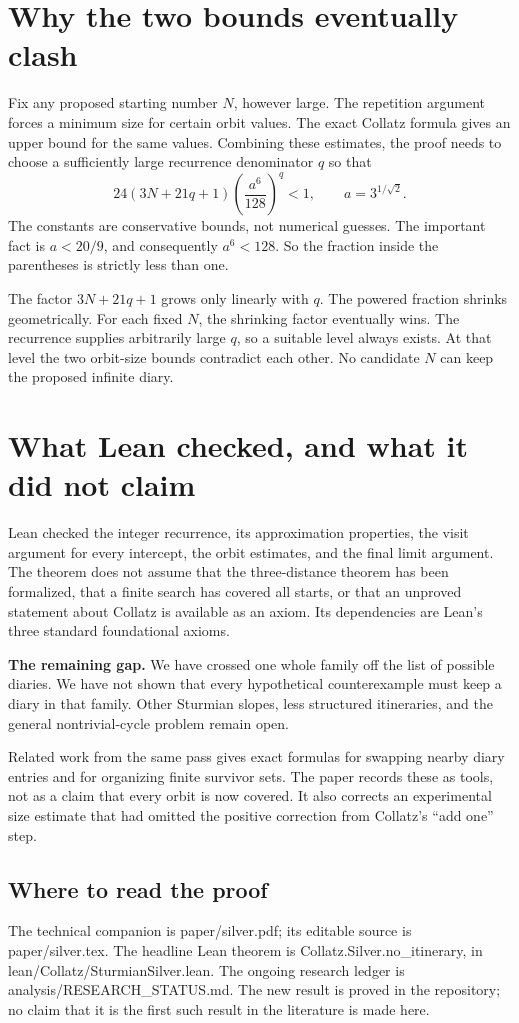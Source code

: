 \documentclass[11pt]{article}
\newcommand{\code}[1]{{\small\ttfamily #1}}
\begin{document}
\newpage
\section{Why the two bounds eventually clash}
Fix any proposed starting number $N$, however large. The repetition
argument forces a minimum size for certain orbit values. The exact
Collatz formula gives an upper bound for the same values. Combining
these estimates, the proof needs to choose a sufficiently large
recurrence denominator $q$ so that
\[
24(3N+21q+1)\left(\frac{a^6}{128}\right)^q<1,
\qquad a=3^{1/\sqrt2}.
\]
The constants are conservative bounds, not numerical guesses. The
important fact is $a<20/9$, and consequently $a^6<128$. So the fraction
inside the parentheses is strictly less than one.

The factor $3N+21q+1$ grows only linearly with $q$. The powered fraction
shrinks geometrically. For each fixed $N$, the shrinking factor eventually
wins. The recurrence supplies arbitrarily large $q$, so a suitable level
always exists. At that level the two orbit-size bounds contradict each
other. No candidate $N$ can keep the proposed infinite diary.

\section{What Lean checked, and what it did not claim}
Lean checked the integer recurrence, its approximation properties, the
visit argument for every intercept, the orbit estimates, and the final
limit argument. The theorem does not assume that the three-distance
theorem has been formalized, that a finite search has covered all starts,
or that an unproved statement about Collatz is available as an axiom.
Its dependencies are Lean's three standard foundational axioms.

\begin{keyidea}
\textbf{The remaining gap.} We have crossed one whole family off the list
of possible diaries. We have not shown that every hypothetical
counterexample must keep a diary in that family. Other Sturmian slopes,
less structured itineraries, and the general nontrivial-cycle problem
remain open.
\end{keyidea}
Related work from the same pass gives exact formulas for swapping nearby
diary entries and for organizing finite survivor sets. The paper records
these as tools, not as a claim that every orbit is now covered. It also
corrects an experimental size estimate that had omitted the positive
correction from Collatz's ``add one'' step.

\subsection*{Where to read the proof}
The technical companion is \code{paper/silver.pdf}; its editable source is
\code{paper/silver.tex}. The headline Lean theorem is
\code{Collatz.Silver.no\_\allowbreak{}itinerary}, in
\code{lean/Collatz/SturmianSilver.lean}. The ongoing research ledger is
\code{analysis/RESEARCH\_\allowbreak{}STATUS.md}. The new result is proved in the
repository; no claim that it is the first such result in the literature
is made here.
\end{document}
